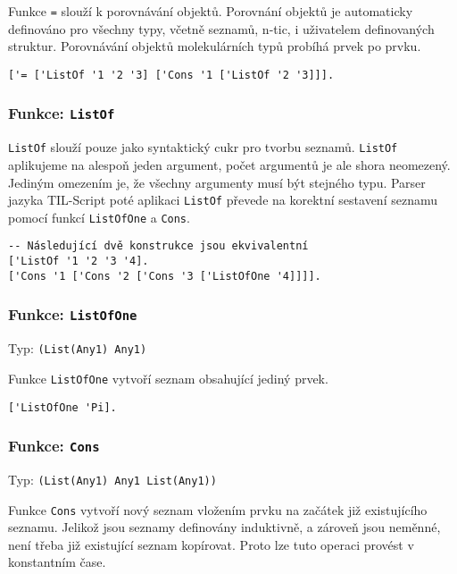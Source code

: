 Funkce \lstinline{=} slouží k porovnávání objektů. Porovnání objektů je automaticky definováno
pro všechny typy, včetně seznamů, n-tic, i uživatelem definovaných struktur. Porovnávání
objektů molekulárních typů probíhá prvek po prvku.

\begin{lstlisting}[caption={Ukázka využití funkce =}]
['= ['ListOf '1 '2 '3] ['Cons '1 ['ListOf '2 '3]]].
\end{lstlisting}

\subsubsection*{Funkce: \lstinline|ListOf|}

\lstinline{ListOf} slouží pouze jako syntaktický cukr pro tvorbu seznamů. \lstinline{ListOf}
aplikujeme na alespoň jeden argument, počet argumentů je ale shora neomezený. Jediným omezením je,
že všechny argumenty musí být stejného typu. Parser jazyka TIL-Script poté aplikaci
\lstinline{ListOf} převede na korektní sestavení seznamu pomocí funkcí \lstinline{ListOfOne} a
\lstinline{Cons}.


\begin{lstlisting}[caption={Ukázka využití ListOf}]
-- Následující dvě konstrukce jsou ekvivalentní
['ListOf '1 '2 '3 '4].
['Cons '1 ['Cons '2 ['Cons '3 ['ListOfOne '4]]]].
\end{lstlisting}

\subsubsection*{Funkce: \lstinline|ListOfOne|}
Typ: \lstinline{(List(Any1) Any1)}

Funkce \lstinline{ListOfOne} vytvoří seznam obsahující jediný prvek.

\begin{lstlisting}[caption={Ukázka využití ListOfOne}]
['ListOfOne 'Pi].
\end{lstlisting}

\subsubsection*{Funkce: \lstinline|Cons|}
Typ: \lstinline{(List(Any1) Any1 List(Any1))}

Funkce \lstinline{Cons} vytvoří nový seznam vložením prvku na začátek již existujícího seznamu.
Jelikož jsou seznamy definovány induktivně, a zároveň jsou neměnné, není třeba již existující seznam
kopírovat. Proto lze tuto operaci provést v konstantním čase.

